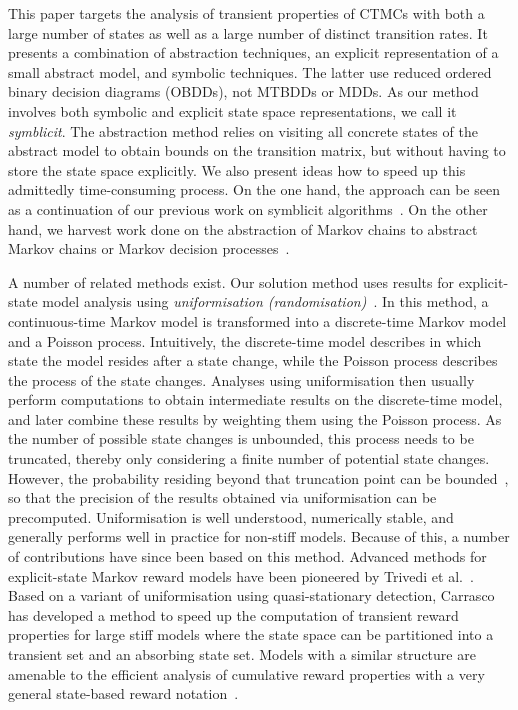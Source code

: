 \documentclass[10pt,twocolumn]{article}
\begin{document}
This paper targets the analysis of transient properties of CTMCs with
both a large number of states as well as a large number of distinct
transition rates. It presents a combination of abstraction techniques,
an explicit representation of a small abstract model, and symbolic
techniques. The latter use reduced ordered binary decision diagrams (OBDDs), not MTBDDs or
MDDs. As our method involves both symbolic and explicit state space representations,
we call it \emph{symblicit}.
The abstraction method relies on
visiting all concrete states of the abstract model to obtain bounds on
the transition matrix, but without having to store the state space
explicitly. We also present ideas how to speed up this admittedly
time-consuming process. On the one hand, the approach can be seen
as a continuation of our previous work on symblicit
algorithms~\cite{WimmerBBHCHDT10,CrouzenHHDTWBB11}. On the other hand,
we harvest work done on the abstraction of Markov chains to abstract
Markov chains or Markov decision
processes~\cite{Klink10,Smith10,KatoenKLW07,Buchholz11,AlfaroR07,KattenbeltKNP10,HermannsWZ08}.

A number of related methods exist.
Our solution method uses results for explicit-state model analysis using \emph{uniformisation (randomisation)}~\cite{Jensen53,GrossM84}.
In this method, a continuous-time Markov model is transformed into a discrete-time Markov model and a Poisson process.
Intuitively, the discrete-time model describes in which state the model resides after a state change, while the Poisson process describes the process of the state changes.
Analyses using uniformisation then usually perform computations to obtain intermediate results on the discrete-time model, and later combine these results by weighting them using the Poisson process.
As the number of possible state changes is unbounded, this process needs to be truncated, thereby only considering a finite number of potential state changes. However, the probability residing beyond that truncation point can be bounded~\cite{FoxG88}, so that the precision of the results obtained via uniformisation can be precomputed.
Uniformisation is well understood, numerically stable, and generally performs well in practice for non-stiff models.
Because of this, a number of contributions have since been based on this method.
Advanced methods for explicit-state Markov reward models have been pioneered by Trivedi et al.~\cite{TrivediRS87}. Based on a variant of uniformisation using quasi-stationary detection, Carrasco has developed a method \cite{Carrasco04} to speed up the
computation of transient reward properties for large stiff models where the state space can be partitioned into a transient set and an absorbing state set. Models with a similar structure are amenable to the efficient analysis of cumulative reward properties with a very general state-based reward
notation~\cite{CarrascoS11}.
\end{document}

